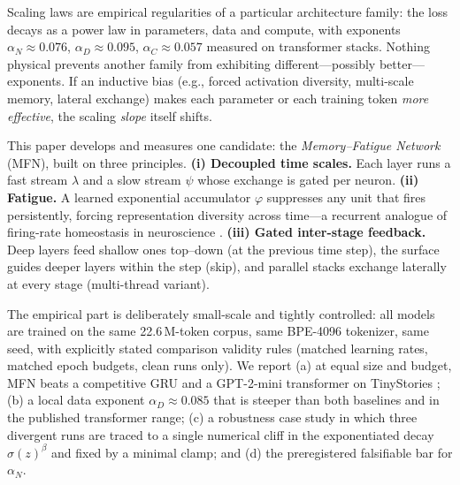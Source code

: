\documentclass[11pt]{article}
\begin{document}
Scaling laws \citep{kaplan2020scaling,hoffmann2022chinchilla} are empirical
regularities of a particular architecture family: the loss decays as a power
law in parameters, data and compute, with exponents
$\alpha_N \approx 0.076$, $\alpha_D \approx 0.095$, $\alpha_C \approx 0.057$
measured on transformer stacks. Nothing physical prevents another family from
exhibiting different---possibly better---exponents. If an inductive bias
(e.g., forced activation diversity, multi-scale memory, lateral exchange)
makes each parameter or each training token \emph{more effective}, the
scaling \emph{slope} itself shifts.

This paper develops and measures one candidate: the \emph{Memory--Fatigue
Network} (MFN), built on three principles. \textbf{(i) Decoupled time
scales.} Each layer runs a fast stream $\lambda$ and a slow stream $\psi$ whose
exchange is gated per neuron. \textbf{(ii) Fatigue.} A learned exponential
accumulator $\varphi$ suppresses any unit that fires persistently, forcing
representation diversity across time---a recurrent analogue of firing-rate
homeostasis in neuroscience \citep{horn1970behavior,stopfer1997impaired}.
\textbf{(iii) Gated inter-stage feedback.} Deep layers feed shallow ones
top--down (at the previous time step), the surface guides deeper layers
within the step (skip), and parallel stacks exchange laterally at every
stage (multi-thread variant).

The empirical part is deliberately small-scale and tightly controlled: all
models are trained on the same 22.6\,M-token corpus, same BPE-4096 tokenizer,
same seed, with explicitly stated comparison validity rules (matched learning
rates, matched epoch budgets, clean runs only). We report (a) at equal size
and budget, MFN beats a competitive GRU and a GPT-2-mini transformer on
TinyStories \citep{eldan2023tinystories}; (b) a local data exponent
$\alpha_D \approx 0.085$ that is steeper than both baselines and in the
published transformer range; (c) a robustness case study in which three
divergent runs are traced to a single numerical cliff in the exponentiated
decay $\sigma(z)^{\beta}$ and fixed by a minimal clamp; and (d) the
preregistered falsifiable bar for $\alpha_N$.
\end{document}

